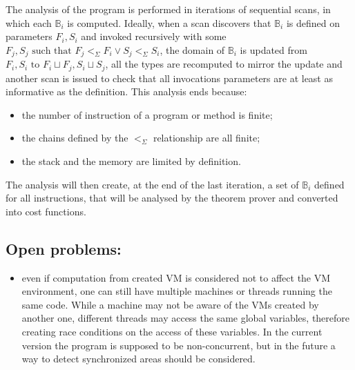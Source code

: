 \documentclass{amsart}
\newcommand{\bB}[1]{\mathbb{B}_{#1}}
\newcommand{\less}{<_\Sigma}
\numberwithin{equation}{section}
\theoremstyle{plain} %
\theoremstyle{definition}
\theoremstyle{remark}
\begin{document}
The analysis of the program is performed in iterations of sequential scans, in which each $\bB{i}$ is computed. Ideally, when a scan discovers that $\bB{i}$ is defined on parameters $F_i, S_i$ and invoked recursively with some $F_j, S_j \text{ such that } F_j \less{} F_i \vee S_j \less{} S_i$, the domain of $\bB{i}$ is updated from $F_i, S_i \text{ to } F_i \sqcup F_j, S_i \sqcup S_j$, all the types are recomputed to mirror the update and another scan is issued to check that all invocations parameters are at least as informative as the definition. This analysis ends because:
\begin{itemize}
\item the number of instruction of a program or method is finite;
\item the chains defined by the $\less$ relationship are all finite;
\item the stack and the memory are limited by definition.
\end{itemize}

The analysis will then create, at the end of the last iteration, a set of $\bB{i}$ defined for all instructions, that will be analysed by the theorem prover and converted into cost functions.

\subsection{Open problems:}
\begin{itemize}
\item even if computation from created VM is considered not to affect the VM environment, one can still have multiple machines or threads running the same code. While a machine may not be aware of the VMs created by another one, different threads may access the same global variables, therefore creating race conditions on the access of these variables. In the current version the program is supposed to be non-concurrent, but in the future a way to detect synchronized areas should be considered.
\end{itemize}


\newpage
\end{document}
